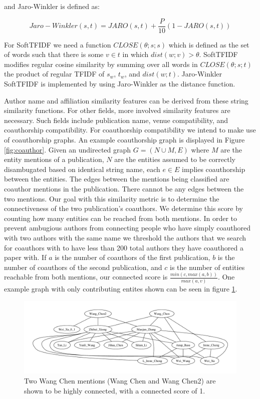 \documentclass[twocolumn,letterpaper]{article}
\begin{document}
and Jaro-Winkler is defined as:
\begin{center}
\[
	Jaro-Winkler(s,t) = JARO(s,t) + \frac{P}{10}(1-JARO(s,t))
\]
\end{center}

For SoftTFIDF we need a function $CLOSE(\theta; s; s)$ which is defined as the set of words such that there is some $v \in t$ in which $dist(w; v) > \theta$. SoftTFIDF modifies regular cosine similarity by summing over all words in $CLOSE(\theta; s; t)$ the product of regular TFIDF of $s_w$, $t_w$, and $dist(w;t)$. Jaro-Winkler SoftTFIDF is implemented by using Jaro-Winkler as the distance function.

Author name and affiliation similarity features can be derived from these string similarity functions. For other fields, more involved similarity features are necessary. Such fields include publication name, venue compatibility, and coauthorship compatibility.  For coauthorship compatibility we intend to make use of coauthorship graphs. An example coauthorship graph is displayed in Figure \ref{fig:coauthor}. Given an undirected graph $G=(N \cup M,E)$ where $M$ are the entity mentions of a publication, $N$ are the entities assumed to be correctly disambugated based on identical string name, each $e \in E$ implies coauthorship between the entities. The edges between the mentions being classified are coauthor mentions in the publication. There cannot be any edges between the two mentions. Our goal with this similarity metric is to determine the connectiveness of the two publication's coauthors. We determine this score by counting how many entities can be reached from both mentions. In order to prevent ambugious authors from connecting people who have simply coauthored with two authors with the same name we threshold the authors that we search for coauthors with to have less than 200 total authors they have coauthored a paper with. If $a$ is the number of coauthors of the first publication, $b$ is the number of coauthors of the second publication, and $c$ is the number of entities reachable from both mentions, our connected score is $\frac{min(c,max(a,b))}{max(a,v)}$. One example graph with only contributing entites shown can be seen in figure \ref{fig:chen}.

\begin{figure}
\centering
\includegraphics[width=\textwidth]{g5}
\caption{Two Wang Chen mentions (Wang Chen and Wang Chen2) are shown to be highly connected, with a connected score of 1.}
\label{fig:chen}
\end{figure}
\end{document}
